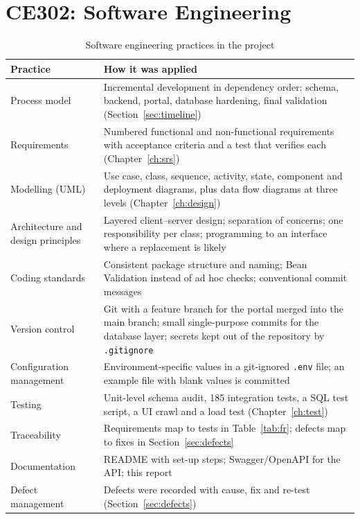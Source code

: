 \section{CE302: Software Engineering}\label{sec:se}
\begin{table}[H]
\centering\small
\caption{Software engineering practices in the project}\label{tab:se}
\begin{tabularx}{\linewidth}{@{}p{3.6cm}X@{}}
\toprule \textbf{Practice} & \textbf{How it was applied}\\ \midrule
Process model & Incremental development in dependency order: schema, backend, portal, database hardening, final validation (Section~\ref{sec:timeline})\\
Requirements & Numbered functional and non-functional requirements with acceptance criteria and a test that verifies each (Chapter~\ref{ch:srs})\\
Modelling (UML) & Use case, class, sequence, activity, state, component and deployment diagrams, plus data flow diagrams at three levels (Chapter~\ref{ch:design})\\
Architecture and design principles & Layered client--server design; separation of concerns; one responsibility per class; programming to an interface where a replacement is likely\\
Coding standards & Consistent package structure and naming; Bean Validation instead of ad hoc checks; conventional commit messages\\
Version control & Git with a feature branch for the portal merged into the main branch; small single-purpose commits for the database layer; secrets kept out of the repository by \texttt{.gitignore}\\
Configuration management & Environment-specific values in a git-ignored \texttt{.env} file; an example file with blank values is committed\\
Testing & Unit-level schema audit, 185 integration tests, a SQL test script, a UI crawl and a load test (Chapter~\ref{ch:test})\\
Traceability & Requirements map to tests in Table~\ref{tab:fr}; defects map to fixes in Section~\ref{sec:defects}\\
Documentation & README with set-up steps; Swagger/OpenAPI for the API; this report\\
Defect management & Defects were recorded with cause, fix and re-test (Section~\ref{sec:defects})\\
\bottomrule
\end{tabularx}
\end{table}

